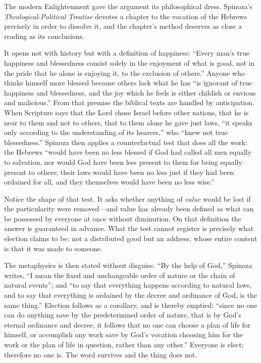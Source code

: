 The modern Enlightenment gave the argument its philosophical dress. Spinoza's \emph{Theological-Political Treatise} devotes a chapter to the vocation of the Hebrews precisely in order to dissolve it, and the chapter's method deserves as close a reading as its conclusions.

It opens not with history but with a definition of happiness: ``Every man's true happiness and blessedness consist solely in the enjoyment of what is good, not in the pride that he alone is enjoying it, to the exclusion of others.'' Anyone who thinks himself more blessed because others lack what he has ``is ignorant of true happiness and blessedness, and the joy which he feels is either childish or envious and malicious.'' From that premise the biblical texts are handled by anticipation. When Scripture says that the Lord chose Israel before other nations, that he is near to them and not to others, that to them alone he gave just laws, ``it speaks only according to the understanding of its hearers,'' who ``knew not true blessedness.'' Spinoza then applies a counterfactual test that does all the work: the Hebrews ``would have been no less blessed if God had called all men equally to salvation, nor would God have been less present to them for being equally present to others; their laws would have been no less just if they had been ordained for all, and they themselves would have been no less wise.''

Notice the shape of that test. It asks whether anything of \emph{value} would be lost if the particularity were removed---and value has already been defined as what can be possessed by everyone at once without diminution. On that definition the answer is guaranteed in advance. What the test cannot register is precisely what election claims to be: not a distributed good but an address, whose entire content is that it was made to someone.

The metaphysics is then stated without disguise. ``By the help of God,'' Spinoza writes, ``I mean the fixed and unchangeable order of nature or the chain of natural events''; and ``to say that everything happens according to natural laws, and to say that everything is ordained by the decree and ordinance of God, is the same thing.'' Election follows as a corollary, and is thereby emptied: ``since no one can do anything save by the predetermined order of nature, that is by God's eternal ordinance and decree, it follows that no one can choose a plan of life for himself, or accomplish any work save by God's vocation choosing him for the work or the plan of life in question, rather than any other.'' Everyone is elect; therefore no one is. The word survives and the thing does not.

